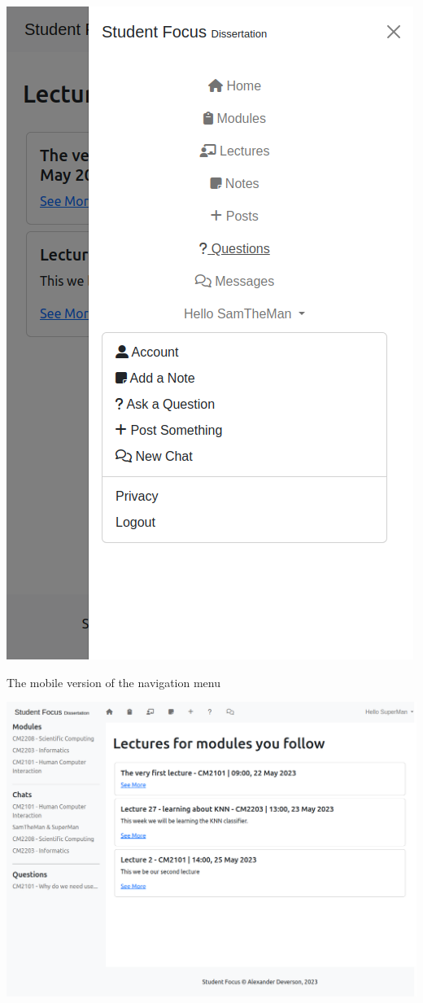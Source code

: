 \includegraphics[scale=0.20]{images/application/41 - mobile_menu.png}

The mobile version of the navigation menu

\includegraphics[scale=0.20]{images/application/42 - responsive.png}

